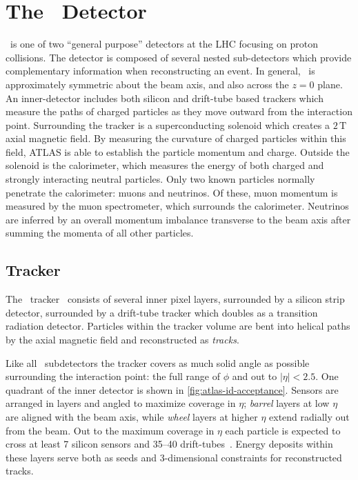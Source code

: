\section{The \atlas\ Detector}
\label{sec:atlas}

\atlas\ is one of two ``general purpose'' detectors at the LHC focusing on proton collisions.
The detector is composed of several nested sub-detectors which provide complementary information when reconstructing an event.
In general, \atlas\ is approximately symmetric about the beam axis, and also across the $z = 0$ plane.
An inner-detector includes both silicon and drift-tube based trackers which measure the paths of charged particles as they move outward from the interaction point.
Surrounding the tracker is a superconducting solenoid which creates a $2\,\text{T}$ axial magnetic field.
By measuring the curvature of charged particles within this field, ATLAS is able to establish the particle momentum and charge.
Outside the solenoid is the calorimeter, which measures the energy of both charged and strongly interacting neutral particles.
Only two known particles normally penetrate the calorimeter: muons and neutrinos.
Of these, muon momentum is measured by the muon spectrometer, which surrounds the calorimeter.
Neutrinos are inferred by an overall momentum imbalance transverse to the beam axis after summing the momenta of all other particles.

\subsection{Tracker}

The \atlas\ tracker~\cite{atlas-id1,atlas-id2} consists of several inner pixel layers, surrounded by a silicon strip detector, surrounded by a drift-tube tracker which doubles as a transition radiation detector.
Particles within the tracker volume are bent into helical paths by the axial magnetic field and reconstructed as \emph{tracks}.

Like all \atlas\ subdetectors the tracker covers as much solid angle as possible surrounding the interaction point: the full range of $\phi$ and out to $|\eta| < 2.5$.
One quadrant of the inner detector is shown in \cref{fig:atlas-id-acceptance}.
Sensors are arranged in layers and angled to maximize coverage in $\eta$; \emph{barrel} layers at low $\eta$ are aligned with the beam axis, while \emph{wheel} layers at higher $\eta$ extend radially out from the beam.
Out to the maximum coverage in $\eta$ each particle is expected to cross at least 7 silicon sensors and 35--40 drift-tubes~\cite{DetPap,atlas-trt2}.
Energy deposits within these layers serve both as seeds and 3-dimensional constraints for reconstructed tracks.

